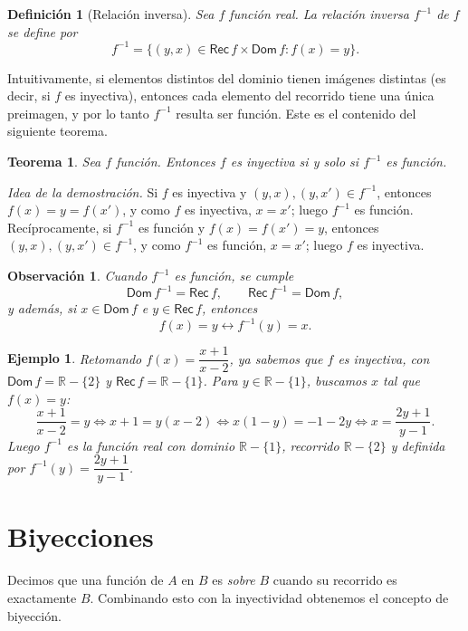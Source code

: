 \documentclass[11pt]{article}
\newtheorem*{definicion}{Definición}
\newtheorem*{ejemplo}{Ejemplo}
\newtheorem*{teorema}{Teorema}
\newtheorem*{observacion}{Observación}
\begin{document}
\begin{definicion}[Relación inversa]
Sea $f$ función real. La relación inversa $f^{-1}$ de $f$ se define por
\[
f^{-1} = \{(y,x) \in \mathsf{Rec}\,f \times \mathsf{Dom}\,f : f(x) = y\}.
\]
\end{definicion}

Intuitivamente, si elementos distintos del dominio tienen imágenes distintas
(es decir, si $f$ es inyectiva), entonces cada elemento del recorrido tiene
una única preimagen, y por lo tanto $f^{-1}$ resulta ser función. Este es el
contenido del siguiente teorema.

\begin{teorema}
Sea $f$ función. Entonces $f$ es inyectiva si y solo si $f^{-1}$ es función.
\end{teorema}

\emph{Idea de la demostración.} Si $f$ es inyectiva y $(y,x), (y,x') \in f^{-1}$,
entonces $f(x) = y = f(x')$, y como $f$ es inyectiva, $x=x'$; luego $f^{-1}$ es
función. Recíprocamente, si $f^{-1}$ es función y $f(x) = f(x') = y$, entonces
$(y,x), (y,x') \in f^{-1}$, y como $f^{-1}$ es función, $x=x'$; luego $f$ es
inyectiva.

\begin{observacion}
Cuando $f^{-1}$ es función, se cumple
\[
\mathsf{Dom}\,f^{-1} = \mathsf{Rec}\,f, \qquad \mathsf{Rec}\,f^{-1} = \mathsf{Dom}\,f,
\]
y además, si $x \in \mathsf{Dom}\,f$ e $y \in \mathsf{Rec}\,f$, entonces
\[
f(x) = y \leftrightarrow f^{-1}(y) = x.
\]
\end{observacion}

\begin{ejemplo}
Retomando $f(x) = \dfrac{x+1}{x-2}$, ya sabemos que $f$ es inyectiva, con
$\mathsf{Dom}\,f = \mathbb{R}-\{2\}$ y $\mathsf{Rec}\,f = \mathbb{R}-\{1\}$.
Para $y \in \mathbb{R}-\{1\}$, buscamos $x$ tal que $f(x) = y$:
\[
\frac{x+1}{x-2} = y \iff x+1 = y(x-2) \iff x(1-y) = -1-2y \iff x = \frac{2y+1}{y-1}.
\]
Luego $f^{-1}$ es la función real con dominio $\mathbb{R}-\{1\}$, recorrido
$\mathbb{R}-\{2\}$ y definida por $f^{-1}(y) = \dfrac{2y+1}{y-1}$.
\end{ejemplo}

\section{Biyecciones}

Decimos que una función de $A$ en $B$ es \emph{sobre} $B$ cuando su recorrido
es exactamente $B$. Combinando esto con la inyectividad obtenemos el concepto
de biyección.
\end{document}
